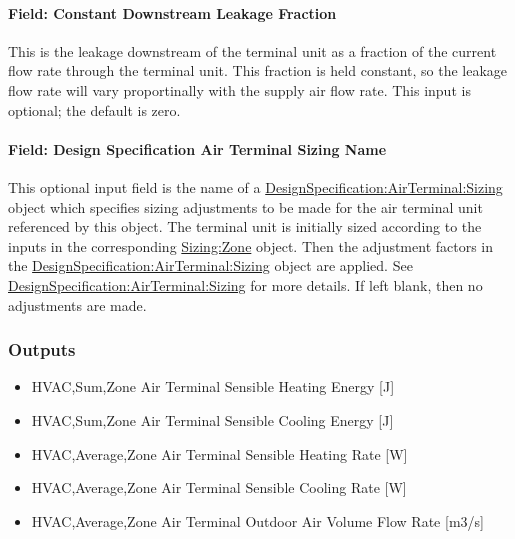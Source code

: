 \paragraph{Field: Constant Downstream Leakage Fraction}\label{field-constant-downstream-leakage-fraction}

This is the leakage downstream of the terminal unit as a fraction of the current flow rate through the terminal unit. This fraction is held constant, so the leakage flow rate will vary proportinally with the supply air flow rate. This input is optional; the default is zero.

\paragraph{Field: Design Specification Air Terminal Sizing Name}\label{design-specification-air-terminal-sizing-name2}

This optional input field is the name of a \hyperref[designspecificationairterminalsizing]{DesignSpecification:AirTerminal:Sizing} object which specifies sizing adjustments to be made for the air terminal unit referenced by this object. The terminal unit is initially sized according to the inputs in the corresponding \hyperref[sizingzone]{Sizing:Zone} object. Then the adjustment factors in the \hyperref[designspecificationairterminalsizing]{DesignSpecification:AirTerminal:Sizing} object are applied. See \hyperref[designspecificationairterminalsizing]{DesignSpecification:AirTerminal:Sizing} for more details. If left blank, then no adjustments are made.

\subsubsection{Outputs}

\begin{itemize}
    \item
    HVAC,Sum,Zone Air Terminal Sensible Heating Energy {[}J{]}
    \item
    HVAC,Sum,Zone Air Terminal Sensible Cooling Energy {[}J{]}
    \item
    HVAC,Average,Zone Air Terminal Sensible Heating Rate {[}W{]}
    \item
    HVAC,Average,Zone Air Terminal Sensible Cooling Rate {[}W{]}
    \item
    HVAC,Average,Zone Air Terminal Outdoor Air Volume Flow Rate {[}m3/s{]}
\end{itemize}

